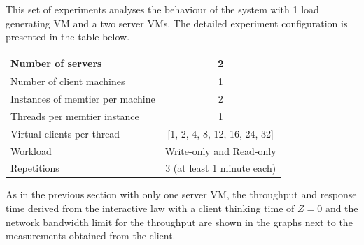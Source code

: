 \documentclass[report.tex]{subfiles}
\begin{document}


This set of experiments analyses the behaviour of the system with 1 load generating VM and a two server VMs. The detailed experiment configuration is presented in the table below.

\begin{center}
	\scriptsize{
		\begin{tabular}{|l|c|}
			\hline Number of servers                & 2                        \\ 
			\hline Number of client machines        & 1                        \\ 
			\hline Instances of memtier per machine & 2                        \\ 
			\hline Threads per memtier instance     & 1                        \\
			\hline Virtual clients per thread       & [1, 2, 4, 8, 12, 16, 24, 32]\\ 
			\hline Workload                         & Write-only and Read-only \\
			\hline Repetitions                      & 3 (at least 1 minute each) \\ 
			\hline 
		\end{tabular}
	} 
\end{center}

As in the previous section with only one server VM, the throughput and response time derived from the interactive law with a client thinking time of $Z=0$ and the network bandwidth limit for the throughput are shown in the graphs next to the measurements obtained from the client.
\end{document}
